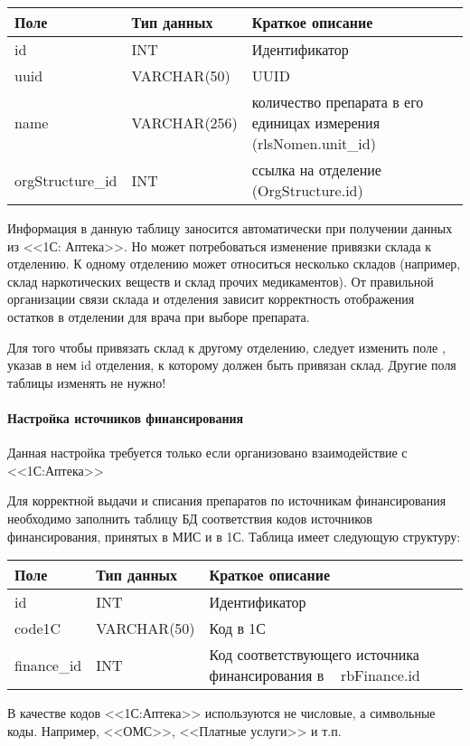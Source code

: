 \begin{table}
\small
{} \label{tbl_oth_rbstor} 
 \begin{tabular}{|p{4cm}|p{4cm}|p{8.7cm}|}
  \hline \rule{0pt}{15pt} \centering \textbf{Поле} & \centering \textbf{Тип данных} & \hfil \textbf{Краткое описание} \\ \hline
  id &	INT &	Идентификатор  \\ \hline
  uuid &	VARCHAR(50) &	UUID \\ \hline 
  name &	VARCHAR(256) &	количество препарата в его единицах измерения (rlsNomen.unit\_id)  \\ \hline
  orgStructure\_id &	INT &	ссылка на отделение (OrgStructure.id)  \\ \hline  
 \end{tabular}
\end{table}

Информация в данную таблицу заносится автоматически при получении данных из <<1С: Аптека>>. Но может потребоваться изменение привязки склада к отделению. К одному отделению может относиться несколько складов (например, склад наркотических веществ и склад прочих медикаментов). От правильной организации связи склада и отделения зависит корректность отображения остатков в отделении для врача при выборе препарата.

Для того чтобы привязать склад к другому отделению, следует изменить поле  , указав в нем id отделения, к которому должен быть привязан склад. Другие поля таблицы изменять не нужно!

\paragraph{Настройка источников финансирования}  

\begin{vnim}
Данная настройка требуется только если организовано взаимодействие с <<1С:Аптека>>
\end{vnim}

Для корректной выдачи и списания препаратов по источникам финансирования необходимо заполнить таблицу БД  соответствия кодов источников финансирования, принятых в МИС и в 1С. Таблица имеет следующую структуру:

\begin{table}
\small
{} \label{tbl_oth_rbfin1c} 
 \begin{tabular}{|p{4cm}|p{4cm}|p{8.7cm}|}
  \hline \rule{0pt}{15pt} \centering \textbf{Поле} & \centering \textbf{Тип данных} & \hfil \textbf{Краткое описание} \\ \hline
  id &	INT &	Идентификатор  \\ \hline
  code1C	& VARCHAR(50) &	Код в 1С \\ \hline
  finance\_id	& INT	& Код соответствующего источника финансирования в \tmis~ {rbFinance.id} \\ \hline
 \end{tabular}
\end{table}

\begin{vnim}
 В качестве кодов <<1С:Аптека>> используются не числовые, а символьные коды. Например, <<ОМС>>, <<Платные услуги>> и т.п.
\end{vnim} 